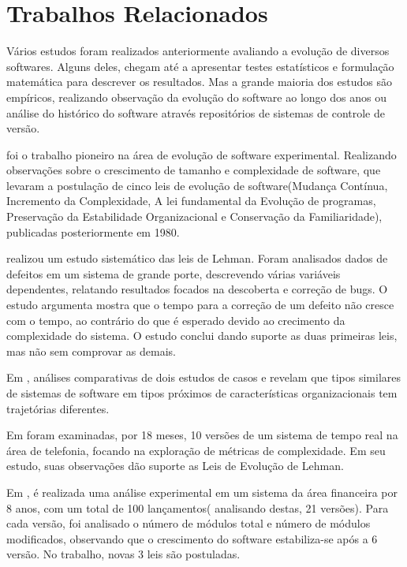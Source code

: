 \chapter{Trabalhos Relacionados}
\label{chapter:trabalhosRelacionados}

Vários estudos foram realizados anteriormente avaliando a evolução de diversos softwares. Alguns deles, chegam até a apresentar testes estatísticos e formulação matemática para descrever os resultados. Mas a grande maioria dos estudos são empíricos, realizando observação da evolução do software ao longo dos anos ou análise do histórico do software através repositórios de sistemas de controle de versão.

\cite{belady1976model} foi o trabalho pioneiro na área de evolução de software experimental. Realizando observações sobre o crescimento  de tamanho e complexidade de software, que levaram a postulação de cinco leis de evolução de software(Mudança Contínua, Incremento da Complexidade, A lei fundamental da Evolução de programas, Preservação da Estabilidade Organizacional e Conservação da Familiaridade), publicadas posteriormente em 1980.

\cite{chong1986empirical,yuen1987statistical,chong1988analyzing} realizou um estudo sistemático das leis de Lehman. Foram analisados dados de defeitos em um sistema de grande porte, descrevendo várias variáveis dependentes, relatando resultados focados na descoberta e correção de bugs. O estudo argumenta mostra que o tempo para a correção de um defeito não cresce com o tempo, ao contrário do que é esperado devido ao crecimento da complexidade do sistema. O estudo conclui dando suporte as duas primeiras leis, mas não sem comprovar as demais.

Em \cite{bendifallah1987understanding}, análises comparativas de dois estudos de casos e revelam que tipos similares de sistemas de software em tipos próximos de características organizacionais tem trajetórias diferentes.

Em \cite{cook1994real} foram examinadas, por 18 meses, 10 versões de um sistema de tempo real na área de telefonia, focando na exploração de métricas de complexidade. Em seu estudo, suas observações dão suporte as Leis de Evolução de Lehman.

Em \cite{lehman1996laws}, é realizada uma análise experimental em um sistema da área financeira por 8 anos, com um total de 100 lançamentos( analisando destas, 21 versões). Para cada versão, foi analisado o número de módulos total e número de módulos modificados, observando que o crescimento do software estabiliza-se após a 6 versão. No trabalho, novas 3 leis são postuladas.

